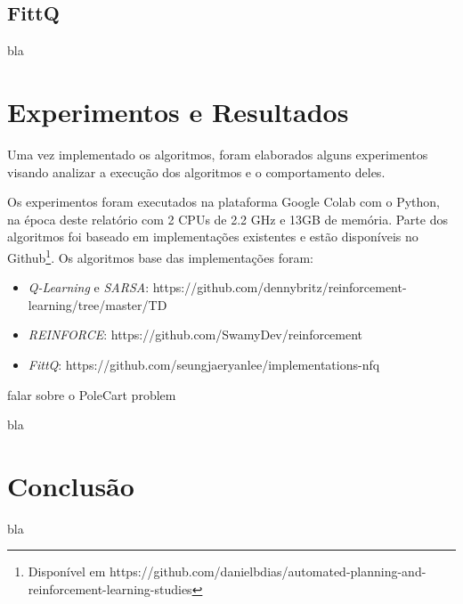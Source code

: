 \documentclass[letterpaper]{article}
\begin{document}

\subsection{FittQ}

bla

\section{Experimentos e Resultados}

Uma vez implementado os algoritmos, foram elaborados alguns experimentos visando analizar a execução dos algoritmos e o comportamento deles.

Os experimentos foram executados na plataforma Google Colab com o Python, na época deste relatório com 2 CPUs de 2.2 GHz e 13GB de memória.
Parte dos algoritmos foi baseado em implementações existentes e estão disponíveis no Github\footnote{Disponível em https://github.com/danielbdias/automated-planning-and-reinforcement-learning-studies}.
Os algoritmos base das implementações foram:

\begin{itemize}
  \item \textit{Q-Learning} e \textit{SARSA}: https://github.com/dennybritz/reinforcement-learning/tree/master/TD
  \item \textit{REINFORCE}: https://github.com/SwamyDev/reinforcement
  \item \textit{FittQ}: https://github.com/seungjaeryanlee/implementations-nfq
\end{itemize}

falar sobre o PoleCart problem

bla

\section{Conclusão}

bla



\end{document}
